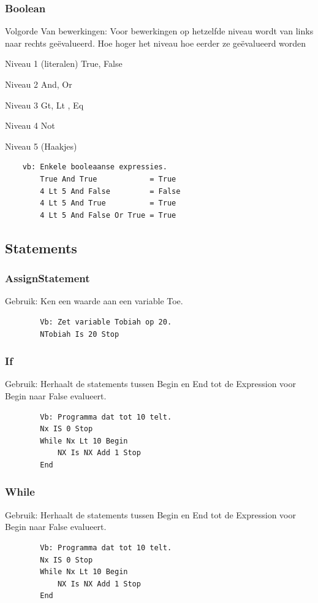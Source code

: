 \documentclass[a4paper,10pt]{article}
\begin{document}
    \subsubsection{Boolean}
    Volgorde Van bewerkingen:
    Voor bewerkingen op hetzelfde niveau wordt van links naar rechts geëvalueerd.
    Hoe hoger het niveau hoe eerder ze geëvalueerd worden

    Niveau 1 (literalen)
    True, False

    Niveau 2
    And, Or

    Niveau 3
    Gt, Lt , Eq

    Niveau 4
    Not

    Niveau 5 (Haakjes)
    \begin{lstlisting}
    vb: Enkele booleaanse expressies.
        True And True            = True
        4 Lt 5 And False         = False
        4 Lt 5 And True          = True
        4 Lt 5 And False Or True = True
    \end{lstlisting}
  \subsection{Statements}
    \subsubsection{AssignStatement}
    Gebruik: Ken een waarde aan een variable Toe.
      \begin{lstlisting}
        Vb: Zet variable Tobiah op 20.
        NTobiah Is 20 Stop
      \end{lstlisting}
    \subsubsection{If}
    Gebruik: Herhaalt de statements tussen Begin en End tot de Expression voor Begin naar False evalueert.
      \begin{lstlisting}
        Vb: Programma dat tot 10 telt.
        Nx IS 0 Stop
        While Nx Lt 10 Begin
            NX Is NX Add 1 Stop
        End
      \end{lstlisting}
    \subsubsection{While}
    Gebruik: Herhaalt de statements tussen Begin en End tot de Expression voor Begin naar False evalueert.
      \begin{lstlisting}
        Vb: Programma dat tot 10 telt.
        Nx IS 0 Stop
        While Nx Lt 10 Begin
            NX Is NX Add 1 Stop
        End
      \end{lstlisting}
\end{document}
